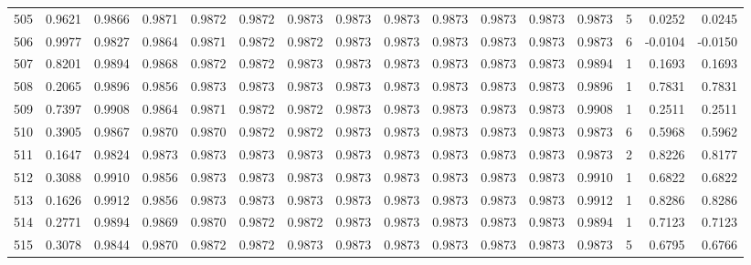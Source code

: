 \begin{tabular}{lrrrrrrrrrrrrrrr}
505 &      0.9621 &  0.9866 &  0.9871 &  0.9872 &  0.9872 &  0.9873 &  0.9873 &  0.9873 &  0.9873 &  0.9873 &   0.9873 &     0.9873 &      5 &                    0.0252 &                     0.0245 \\
506 &      0.9977 &  0.9827 &  0.9864 &  0.9871 &  0.9872 &  0.9872 &  0.9873 &  0.9873 &  0.9873 &  0.9873 &   0.9873 &     0.9873 &      6 &                   -0.0104 &                    -0.0150 \\
507 &      0.8201 &  0.9894 &  0.9868 &  0.9872 &  0.9872 &  0.9873 &  0.9873 &  0.9873 &  0.9873 &  0.9873 &   0.9873 &     0.9894 &      1 &                    0.1693 &                     0.1693 \\
508 &      0.2065 &  0.9896 &  0.9856 &  0.9873 &  0.9873 &  0.9873 &  0.9873 &  0.9873 &  0.9873 &  0.9873 &   0.9873 &     0.9896 &      1 &                    0.7831 &                     0.7831 \\
509 &      0.7397 &  0.9908 &  0.9864 &  0.9871 &  0.9872 &  0.9872 &  0.9873 &  0.9873 &  0.9873 &  0.9873 &   0.9873 &     0.9908 &      1 &                    0.2511 &                     0.2511 \\
510 &      0.3905 &  0.9867 &  0.9870 &  0.9870 &  0.9872 &  0.9872 &  0.9873 &  0.9873 &  0.9873 &  0.9873 &   0.9873 &     0.9873 &      6 &                    0.5968 &                     0.5962 \\
511 &      0.1647 &  0.9824 &  0.9873 &  0.9873 &  0.9873 &  0.9873 &  0.9873 &  0.9873 &  0.9873 &  0.9873 &   0.9873 &     0.9873 &      2 &                    0.8226 &                     0.8177 \\
512 &      0.3088 &  0.9910 &  0.9856 &  0.9873 &  0.9873 &  0.9873 &  0.9873 &  0.9873 &  0.9873 &  0.9873 &   0.9873 &     0.9910 &      1 &                    0.6822 &                     0.6822 \\
513 &      0.1626 &  0.9912 &  0.9856 &  0.9873 &  0.9873 &  0.9873 &  0.9873 &  0.9873 &  0.9873 &  0.9873 &   0.9873 &     0.9912 &      1 &                    0.8286 &                     0.8286 \\
514 &      0.2771 &  0.9894 &  0.9869 &  0.9870 &  0.9872 &  0.9872 &  0.9873 &  0.9873 &  0.9873 &  0.9873 &   0.9873 &     0.9894 &      1 &                    0.7123 &                     0.7123 \\
515 &      0.3078 &  0.9844 &  0.9870 &  0.9872 &  0.9872 &  0.9873 &  0.9873 &  0.9873 &  0.9873 &  0.9873 &   0.9873 &     0.9873 &      5 &                    0.6795 &                     0.6766 \\

\end{tabular}

